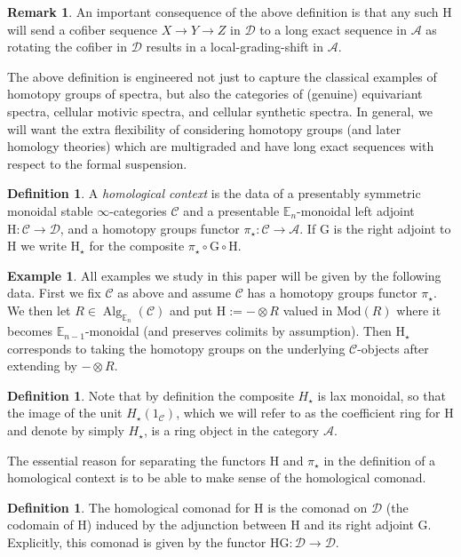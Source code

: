 \documentclass[10pt]{amsart}
\theoremstyle{definition}
\numberwithin{figure}{section}
\numberwithin{equation}{section}
\newtheorem{definition}[figure]{Definition}
\newtheorem{remark}[figure]{Remark}
\newtheorem{example}[figure]{Example}
\newcommand{\cA}{\mathcal{A}}
\newcommand{\cC}{\mathcal{C}}
\newcommand{\cD}{\mathcal{D}}
\newcommand{\one}{\mathrm{1}}
\theoremstyle{cited}
\newcommand{\bE}{\mathbb{E}}
\newcommand{\Alg}{\operatorname{Alg}}
\newcommand{\Mod}{\mathrm{Mod}}
\renewcommand{\H}{\mathrm{H}}
\newcommand{\G}{\mathrm{G}}
\begin{document}
\begin{remark}
  An important consequence of the above definition is that any such $\H$ will send a cofiber sequence $X\to Y\to Z$ in $\cD$ to a long exact sequence in $\cA$ as rotating the cofiber in $\cD$ results in a local-grading-shift in $\cA$.
\end{remark}

The above definition is engineered not just to capture the classical examples of homotopy groups of spectra, but also the categories of (genuine) equivariant spectra, cellular motivic spectra, and cellular synthetic spectra. In general, we will want the extra flexibility of considering homotopy groups (and later homology theories) which are multigraded and have long exact sequences with respect to the formal suspension.

\begin{definition}
  \label{def:homcontext}
  A \textit{homological context} is the data of a presentably symmetric monoidal  stable $\infty$-categories $\cC$ and a presentable $\bE_n$-monoidal left adjoint $\H:\cC\to \cD$, and a homotopy groups functor $\pi_\star:\cC\to \cA$. If $\G$ is the right adjoint to $\H$ we write $\H_\star$ for the composite $\pi_\star\circ \G\circ \H$.
\end{definition}

\begin{example}
  All examples we study in this paper will be given by the following data. First we fix $\cC$ as above and assume $\cC$ has a homotopy groups functor $\pi_\star$. We then let $R\in \Alg_{\bE_n}(\cC)$ and put $\H:=-\otimes R$ valued in $\Mod(R)$ where it becomes $\bE_{n-1}$-monoidal (and preserves colimits by assumption). Then $\H_\star$ corresponds to taking the homotopy groups on the underlying $\cC$-objects after extending by $-\otimes R$.
\end{example}

\begin{definition}
  Note that by definition the composite $H_\star$ is lax monoidal, so that the image of the unit $H_\star(\one_{\cC})$, which we will refer to as the coefficient ring for $\H$ and denote by simply $H_\star$, is a ring object in the category $\cA$.
\end{definition}

The essential reason for separating the functors $\H$ and $\pi_\star$ in the definition of a homological context is to be able to make sense of the homological comonad.

\begin{definition}
  The homological comonad for $\H$ is the comonad on $\cD$ (the codomain of $\H$) induced by the adjunction between $\H$ and its right adjoint $\G$. Explicitly, this comonad is given by the functor $\H\G: \cD\to \cD$. 
\end{definition}
\end{document}
